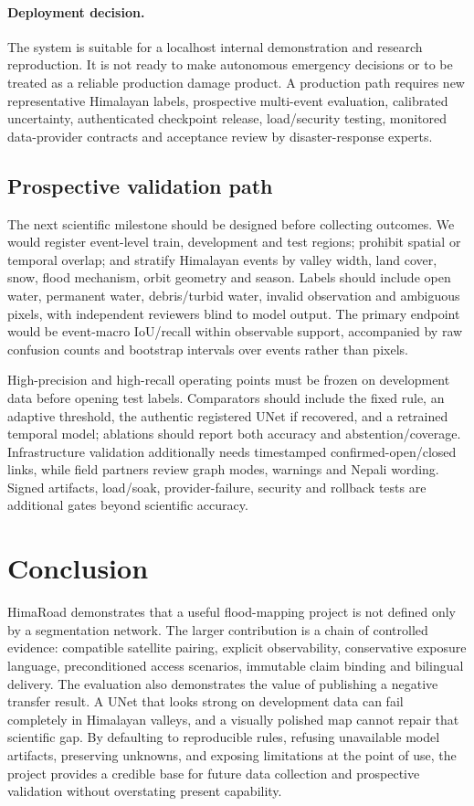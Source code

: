 \documentclass[10pt,twocolumn,letterpaper]{article}
\newcommand{\system}{HimaRoad\xspace}
\begin{document}
\paragraph{Deployment decision.}
The system is suitable for a localhost internal demonstration and research
reproduction. It is not ready to make autonomous emergency decisions or to be
treated as a reliable production damage product. A production path requires new
representative Himalayan labels, prospective multi-event evaluation, calibrated
uncertainty, authenticated checkpoint release, load/security testing, monitored
data-provider contracts and acceptance review by disaster-response experts.

\subsection{Prospective validation path}
The next scientific milestone should be designed before collecting outcomes. We
would register event-level train, development and test regions; prohibit spatial
or temporal overlap; and stratify Himalayan events by valley width, land cover,
snow, flood mechanism, orbit geometry and season. Labels should include open
water, permanent water, debris/turbid water, invalid observation and ambiguous
pixels, with independent reviewers blind to model output. The primary endpoint
would be event-macro IoU/recall within observable support, accompanied by raw
confusion counts and bootstrap intervals over events rather than pixels.

High-precision and high-recall operating points must be frozen on development
data before opening test labels. Comparators should include the fixed rule, an
adaptive threshold, the authentic registered UNet if recovered, and a retrained
temporal model; ablations should report both accuracy and abstention/coverage.
Infrastructure validation additionally needs timestamped confirmed-open/closed
links, while field partners review graph modes, warnings and Nepali wording.
Signed artifacts, load/soak, provider-failure, security and rollback tests are
additional gates beyond scientific accuracy.

\section{Conclusion}
\system demonstrates that a useful flood-mapping project is not defined only by
a segmentation network. The larger contribution is a chain of controlled
evidence: compatible satellite pairing, explicit observability, conservative
exposure language, preconditioned access scenarios, immutable claim binding and
bilingual delivery. The evaluation also demonstrates the value of publishing a
negative transfer result. A UNet that looks strong on development data can fail
completely in Himalayan valleys, and a visually polished map cannot repair that
scientific gap. By defaulting to reproducible rules, refusing unavailable model
artifacts, preserving unknowns, and exposing limitations at the point of use,
the project provides a credible base for future data collection and prospective
validation without overstating present capability.

{\small


}
\end{document}
